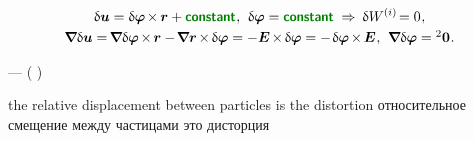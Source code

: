 \nopagebreak\vspace{-0.1em}
\begin{equation*}
\begin{array}{c}
\variation{\fieldofdisplacements} = \variation{\fieldofrotations} \hspace{-0.2ex} \times \hspace{-0.12ex} \locationvector + \boldconstant \hspace{.1ex} ,
\:\,
\variation{\fieldofrotations} = \boldconstant
\hspace{.64ex}\Rightarrow\hspace{.5ex}
\variation{\internalwork} \hspace{-0.2ex} = 0 \hspace{.1ex},
\\[.25em]
%
\boldnabla \variation{\fieldofdisplacements}
= \hspace{-0.25ex} \boldnabla \variation{\fieldofrotations} %
\hspace{-0.2ex} \times \hspace{-0.2ex} \locationvector
- \hspace{-0.25ex} \boldnabla \locationvector \hspace{-0.2ex} \times \hspace{-0.2ex} \variation{\fieldofrotations}
= - \UnitDyad \hspace{-0.2ex} \times \hspace{-0.2ex} \variation{\fieldofrotations}
= - \hspace{.2ex} \variation{\fieldofrotations} \hspace{-0.2ex} \times \hspace{-0.2ex} \UnitDyad
\hspace{.1ex} ,
\:\,
\boldnabla \variation{\fieldofrotations} = {^2\bm{0}} \hspace{.1ex} .
\end{array}
\end{equation*}

\vspace{-0.1em}
\:---
( 
\ru )

the relative displacement between particles is the distortion
\distortiontensor
относительное смещение между частицами это дисторция


